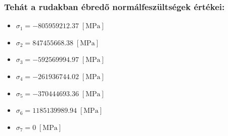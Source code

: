 \documentclass[12pt,a4paper]{article}
\def\Mpa{\; \left[\mathrm{MPa}\right]}
\begin{document}
\subsubsection*{Tehát a rudakban ébredő normálfeszültségek értékei:}
\begin{multicols}{2}
    \begin{itemize}
        \item $\sigma_1= -805959212.37 \Mpa$
        \item $\sigma_2=  847455668.38 \Mpa$
        \item $\sigma_3=  -592569994.97 \Mpa$
        \item $\sigma_4=  -261936744.02 \Mpa$
    \end{itemize}
    \columnbreak
    \begin{itemize}
        \item $\sigma_5= -370444693.36 \Mpa$
        \item $\sigma_6=  1185139989.94 \Mpa$
        \item $\sigma_7=  0 \Mpa$
    \end{itemize}
\end{multicols}
\newpage
\tableofcontents
\end{document}
